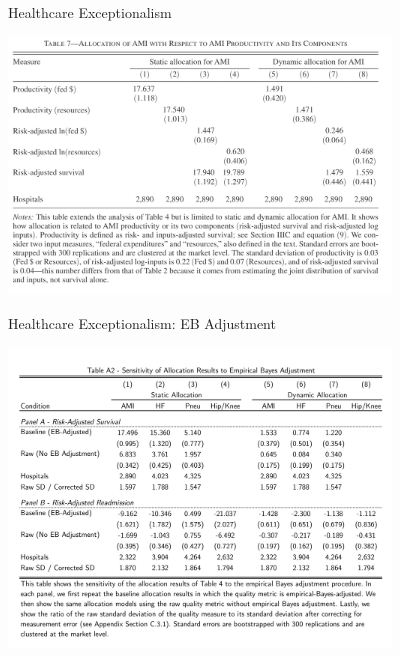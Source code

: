 \documentclass[xcolor=pdftex,dvipsnames,table,mathserif,aspectratio=169]{beamer}
\begin{document}
\begin{frame}{Healthcare Exceptionalism}
\begin{center}
\includegraphics[width=4in]{./resources/hc7.png}
\end{center}
\end{frame}

\begin{frame}{Healthcare Exceptionalism: EB Adjustment}
\begin{center}
\includegraphics[width=4in]{./resources/hc_a2.png}
\end{center}
\end{frame}
\end{document}
